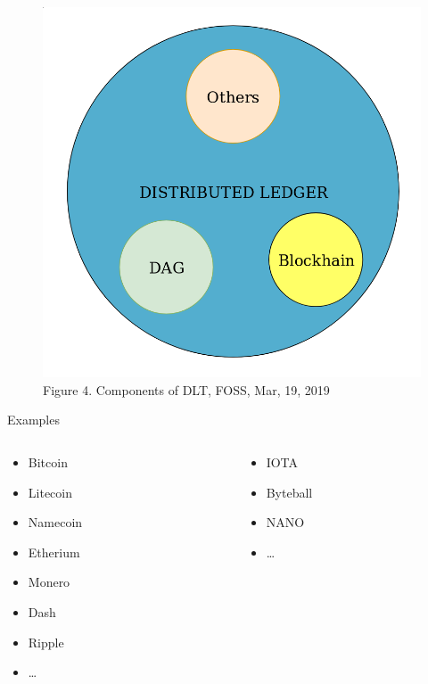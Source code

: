 \documentclass[xcolor=x11names,compress]{beamer}
\renewcommand{\(}{\begin{columns}}
\renewcommand{\)}{\end{columns}}
\newcommand{\<}[1]{\begin{column}{#1}}
\renewcommand{\>}{\end{column}}
\begin{document}
\begin{frame}
    \begin{figure}
        \includegraphics[scale=0.2]{./images/dl}
        \caption{\tiny  Figure 4. Components of DLT, FOSS, Mar, 19, 2019}
    \end{figure}
\end{frame}

\begin{frame}{Examples}
    \(
        \begin{column}{0.5\textwidth}
    \begin{itemize}
        \item Bitcoin
        \item Litecoin
        \item Namecoin
        \item Etherium
        \item Monero
        \item Dash
        \item Ripple
        \item \dots
    \end{itemize}
    \end{column}
        \begin{column}{0.5\textwidth}
    \begin{itemize}
        \item IOTA
        \item Byteball
        \item NANO
        \item \dots
    \end{itemize}
        \end{column}
    \)
\end{frame}
\end{document}
